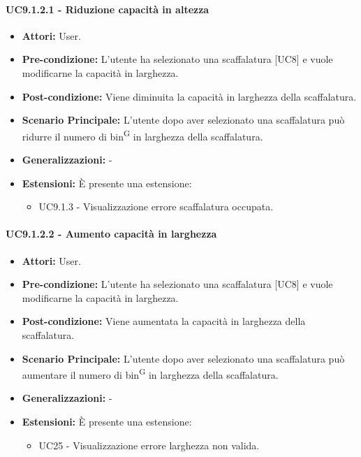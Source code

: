 \paragraph{UC9.1.2.1 - Riduzione capacità in altezza}
\begin{itemize}
    \item \textbf{Attori:} User.
    \item \textbf{Pre-condizione:} L'utente ha selezionato una scaffalatura [UC8] e vuole modificarne la capacità in larghezza.
    \item \textbf{Post-condizione:} Viene diminuita la capacità in larghezza della scaffalatura.
    \item \textbf{Scenario Principale:} L'utente dopo aver selezionato una scaffalatura può ridurre il numero di bin\textsuperscript{G} in larghezza della scaffalatura.
    \item \textbf{Generalizzazioni:} -
    \item \textbf{Estensioni:} È presente una estensione:
    \begin{itemize}
        \item UC9.1.3 - Visualizzazione errore scaffalatura occupata.
    \end{itemize}
\end{itemize}


\paragraph{UC9.1.2.2 - Aumento capacità in larghezza}
\begin{itemize}
    \item \textbf{Attori:} User.
    \item \textbf{Pre-condizione:} L'utente ha selezionato una scaffalatura [UC8] e vuole modificarne la capacità in larghezza.
    \item \textbf{Post-condizione:} Viene aumentata la capacità in larghezza della scaffalatura.
    \item \textbf{Scenario Principale:} L'utente dopo aver selezionato una scaffalatura può aumentare il numero di bin\textsuperscript{G} in larghezza della scaffalatura.
    \item \textbf{Generalizzazioni:} -
    \item \textbf{Estensioni:} È presente una estensione:
    \begin{itemize}
        \item UC25 - Visualizzazione errore larghezza non valida.
    \end{itemize}
\end{itemize}



